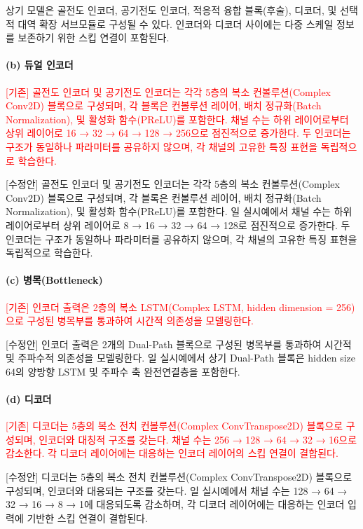 \documentclass{article}
\newcommand{\reviewold}[1]{{\par\noindent\textcolor{red}{[기존] #1}}}
\newcommand{\reviewnew}[1]{{\par\noindent\textcolor{customblue}{[수정안] #1}}}
\newcommand{\reviewpair}[2]{\reviewold{#1}\reviewnew{#2}\par}
\begin{document}
상기 모델은 골전도 인코더, 공기전도 인코더, 적응적 융합 블록(후술), 디코더, 및 선택적 대역 확장 서브모듈로 구성될 수 있다. 인코더와 디코더 사이에는 다중 스케일 정보를 보존하기 위한 스킵 연결이 포함된다.

\paragraph{(b) 듀얼 인코더}

\reviewpair{골전도 인코더 및 공기전도 인코더는 각각 5층의 복소 컨볼루션(Complex Conv2D) 블록으로 구성되며, 각 블록은 컨볼루션 레이어, 배치 정규화(Batch Normalization), 및 활성화 함수(PReLU)를 포함한다. 채널 수는 하위 레이어로부터 상위 레이어로 16 → 32 → 64 → 128 → 256으로 점진적으로 증가한다. 두 인코더는 구조가 동일하나 파라미터를 공유하지 않으며, 각 채널의 고유한 특징 표현을 독립적으로 학습한다.}{골전도 인코더 및 공기전도 인코더는 각각 5층의 복소 컨볼루션(Complex Conv2D) 블록으로 구성되며, 각 블록은 컨볼루션 레이어, 배치 정규화(Batch Normalization), 및 활성화 함수(PReLU)를 포함한다. 일 실시예에서 채널 수는 하위 레이어로부터 상위 레이어로 8 → 16 → 32 → 64 → 128로 점진적으로 증가한다. 두 인코더는 구조가 동일하나 파라미터를 공유하지 않으며, 각 채널의 고유한 특징 표현을 독립적으로 학습한다.}

\paragraph{(c) 병목(Bottleneck)}

\reviewpair{인코더 출력은 2층의 복소 LSTM(Complex LSTM, hidden dimension = 256)으로 구성된 병목부를 통과하여 시간적 의존성을 모델링한다.}{인코더 출력은 2개의 Dual-Path 블록으로 구성된 병목부를 통과하여 시간적 및 주파수적 의존성을 모델링한다. 일 실시예에서 상기 Dual-Path 블록은 hidden size 64의 양방향 LSTM 및 주파수 축 완전연결층을 포함한다.}

\paragraph{(d) 디코더}

\reviewpair{디코더는 5층의 복소 전치 컨볼루션(Complex ConvTranspose2D) 블록으로 구성되며, 인코더와 대칭적 구조를 갖는다. 채널 수는 256 → 128 → 64 → 32 → 16으로 감소한다. 각 디코더 레이어에는 대응하는 인코더 레이어의 스킵 연결이 결합된다.}{디코더는 5층의 복소 전치 컨볼루션(Complex ConvTranspose2D) 블록으로 구성되며, 인코더와 대응되는 구조를 갖는다. 일 실시예에서 채널 수는 128 → 64 → 32 → 16 → 8 → 1에 대응되도록 감소하며, 각 디코더 레이어에는 대응하는 인코더 입력에 기반한 스킵 연결이 결합된다.}
\end{document}
